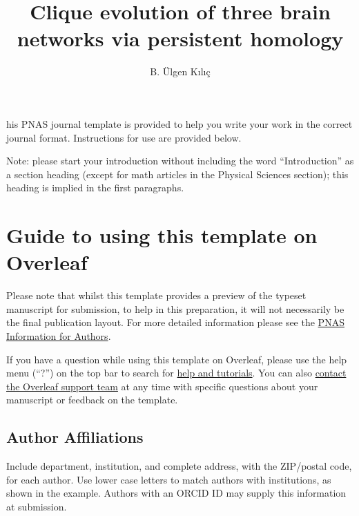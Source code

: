 \documentclass[9pt,twocolumn,twoside,lineno]{pnas-new}
\title{Clique evolution of three brain networks via persistent homology}
\author[a,1]{B. Ülgen Kılıç}
\affil[a]{University at Buffalo, Department of Mathematics}
\begin{document}
\maketitle
\thispagestyle{firststyle}

his PNAS journal template is provided to help you write your work in the correct journal format.  Instructions for use are provided below. 

Note: please start your introduction without including the word ``Introduction'' as a section heading (except for math articles in the Physical Sciences section); this heading is implied in the first paragraphs. 

\section*{Guide to using this template on Overleaf}

Please note that whilst this template provides a preview of the typeset manuscript for submission, to help in this preparation, it will not necessarily be the final publication layout. For more detailed information please see the \href{http://www.pnas.org/site/authors/format.xhtml}{PNAS Information for Authors}.

If you have a question while using this template on Overleaf, please use the help menu (``?'') on the top bar to search for \href{https://www.overleaf.com/help}{help and tutorials}. You can also \href{https://www.overleaf.com/contact}{contact the Overleaf support team} at any time with specific questions about your manuscript or feedback on the template.

\subsection*{Author Affiliations}

Include department, institution, and complete address, with the ZIP/postal code, for each author. Use lower case letters to match authors with institutions, as shown in the example. Authors with an ORCID ID may supply this information at submission.
\end{document}
